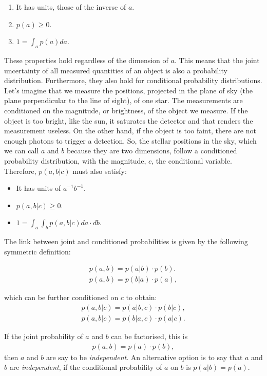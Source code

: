 \begin{enumerate}[label=\textbf{Property \arabic*}]
\item  It has units, those of the inverse of $a$. \label{property:1}
\item $p(a) \geq 0$. \label{property:3}
\item $1=\int_a p(a) da$. \label{property:3}
\end{enumerate}

These properties hold regardless of the dimension of $a$. This means that the joint uncertainty of all measured quantities of an object is also a probability distribution. Furthermore, they also hold for conditional probability distributions. Let's imagine that we measure the positions, projected in the plane of sky (the plane perpendicular to the line of sight), of one star. The measurements are conditioned on the magnitude, or brightness, of the object we measure. If the object is too bright, like the sun, it saturates the detector and that renders the measurement useless. On the other hand, if the object is too faint, there are not enough photons to trigger a detection. So, the stellar positions in the sky, which we can call $a$ and $b$ because they are two dimensions, follow a conditioned probability distribution, with the magnitude, $c$, the conditional variable. Therefore, $p(a,b|c)$ must also satisfy:

\begin{itemize}
\item It has units of $a^{-1} b^{-1}$.
\item $p(a,b|c)\geq0$.
\item $1=\int_a \int_b p(a,b|c)da\cdot db$.
\end{itemize}

The link between joint and conditioned probabilities is given by the following symmetric definition:

\begin{align}
p(a,b)=p(a|b)\cdot p(b).\nonumber \\
p(a,b)=p(b|a) \cdot p(a),
\end{align}

which can be further conditioned on $c$ to obtain:
\begin{align}
\label{eq:conditioned}
p(a,b|c)=p(a|b,c)\cdot p(b|c),\nonumber \\
p(a,b|c)=p(b|a,c) \cdot p(a|c).
\end{align}

If the joint probability of $a$ and $b$ can be factorised, this is
\begin{align}
p(a,b)=p(a)\cdot p(b),
\end{align}
then $a$ and $b$ are say to be \emph{independent}. An alternative option is to say that $a$ and $b$ are \emph{independent}, if the conditional probability of $a$ on $b$ is $p(a|b)=p(a)$.

